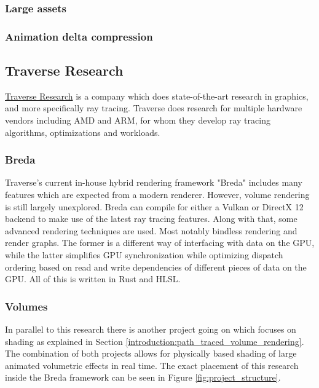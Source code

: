 \subsubsection{Large assets} \label{introduction:gaps_in_current_research:large_assets}
\subsubsection{Animation delta compression} \label{introduction:gaps_in_current_research:animation_delta_compression}







\subsection{Traverse Research} \label{introduction:traverse_research}
\href{https://traverseresearch.nl/}{Traverse Research} is a company which does state-of-the-art research in graphics, and more specifically ray tracing. Traverse does research for multiple hardware vendors including AMD and ARM, for whom they develop ray tracing algorithms, optimizations and workloads.
\subsubsection{Breda} \label{introduction:traverse_research:breda}
Traverse's current in-house hybrid rendering framework "Breda" includes many features which are expected from a modern renderer. However, volume rendering is still largely unexplored. Breda can compile for either a Vulkan or DirectX 12 backend to make use of the latest ray tracing features. Along with that, some advanced rendering techniques are used. Most notably bindless rendering\cite{BindlessRenderingSetup} and render graphs\cite{RenderGraph101}. The former is a different way of interfacing with data on the GPU, while the latter simplifies GPU synchronization while optimizing dispatch ordering based on read and write dependencies of different pieces of data on the GPU. All of this is written in Rust and HLSL.
\subsubsection{Volumes} \label{introduction:traverse_research:volumes}
In parallel to this research there is another project going on which focuses on shading as explained in Section \ref{introduction:path_traced_volume_rendering}. The combination of both projects allows for physically based shading of large animated volumetric effects in real time. The exact placement of this research inside the Breda framework can be seen in Figure \ref{fig:project_structure}.

